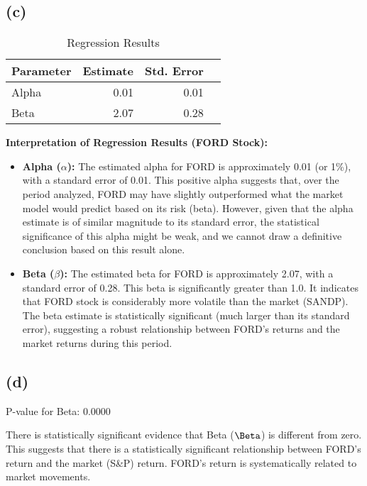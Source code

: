     \subsection{(c)}\label{c}

\begin{table}[H]
\centering
\caption{Regression Results}
\label{tab:regression_results}
\begin{tabular}{lrrr}
\toprule
Parameter & Estimate & Std. Error \\
\midrule
Alpha & 0.01 & 0.01 \\
Beta & 2.07 & 0.28 \\
\bottomrule
\end{tabular}
\end{table}



    \textbf{Interpretation of Regression Results (FORD Stock):}

\begin{itemize}
\item
  \textbf{Alpha (\(\alpha\)):} The estimated alpha for FORD is
  approximately 0.01 (or 1\%), with a standard error of 0.01. This
  positive alpha suggests that, over the period analyzed, FORD may have
  slightly outperformed what the market model would predict based on its
  risk (beta). However, given that the alpha estimate is of similar
  magnitude to its standard error, the statistical significance of this
  alpha might be weak, and we cannot draw a definitive conclusion based
  on this result alone.
\item
  \textbf{Beta (\(\beta\)):} The estimated beta for FORD is
  approximately 2.07, with a standard error of 0.28. This beta is
  significantly greater than 1.0. It indicates that FORD stock is
  considerably more volatile than the market (SANDP). The beta estimate
  is statistically significant (much larger than its standard error),
  suggesting a robust relationship between FORD's returns and the market
  returns during this period.
\end{itemize}

    \subsection{(d)}\label{d}

P-value for Beta: 0.0000


    There is statistically significant evidence that Beta (\(\Beta\)) is
different from zero. This suggests that there is a statistically
significant relationship between FORD's return and the market (S\&P)
return. FORD's return is systematically related to market movements.

